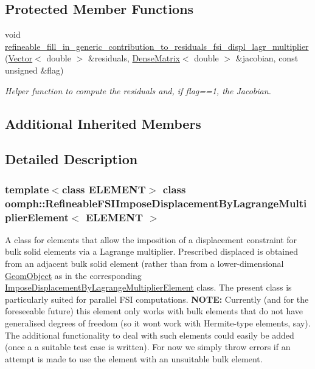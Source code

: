 \subsection*{Protected Member Functions}
\begin{DoxyCompactItemize}
\item 
void \hyperlink{classoomph_1_1RefineableFSIImposeDisplacementByLagrangeMultiplierElement_ae1d4605f02c0fd56b470e80843149e67}{refineable\+\_\+fill\+\_\+in\+\_\+generic\+\_\+contribution\+\_\+to\+\_\+residuals\+\_\+fsi\+\_\+displ\+\_\+lagr\+\_\+multiplier} (\hyperlink{classoomph_1_1Vector}{Vector}$<$ double $>$ \&residuals, \hyperlink{classoomph_1_1DenseMatrix}{Dense\+Matrix}$<$ double $>$ \&jacobian, const unsigned \&flag)
\begin{DoxyCompactList}\small\item\em Helper function to compute the residuals and, if flag==1, the Jacobian. \end{DoxyCompactList}\end{DoxyCompactItemize}
\subsection*{Additional Inherited Members}


\subsection{Detailed Description}
\subsubsection*{template$<$class E\+L\+E\+M\+E\+NT$>$\newline
class oomph\+::\+Refineable\+F\+S\+I\+Impose\+Displacement\+By\+Lagrange\+Multiplier\+Element$<$ E\+L\+E\+M\+E\+N\+T $>$}

A class for elements that allow the imposition of a displacement constraint for bulk solid elements via a Lagrange multiplier. Prescribed displaced is obtained from an adjacent bulk solid element (rather than from a lower-\/dimensional \hyperlink{classoomph_1_1GeomObject}{Geom\+Object} as in the corresponding \hyperlink{classoomph_1_1ImposeDisplacementByLagrangeMultiplierElement}{Impose\+Displacement\+By\+Lagrange\+Multiplier\+Element} class. The present class is particularly suited for parallel F\+SI computations. {\bfseries N\+O\+TE\+:} Currently (and for the foreseeable future) this element only works with bulk elements that do not have generalised degrees of freedom (so it won\textquotesingle{}t work with Hermite-\/type elements, say). The additional functionality to deal with such elements could easily be added (once a a suitable test case is written). For now we simply throw errors if an attempt is made to use the element with an unsuitable bulk element.

